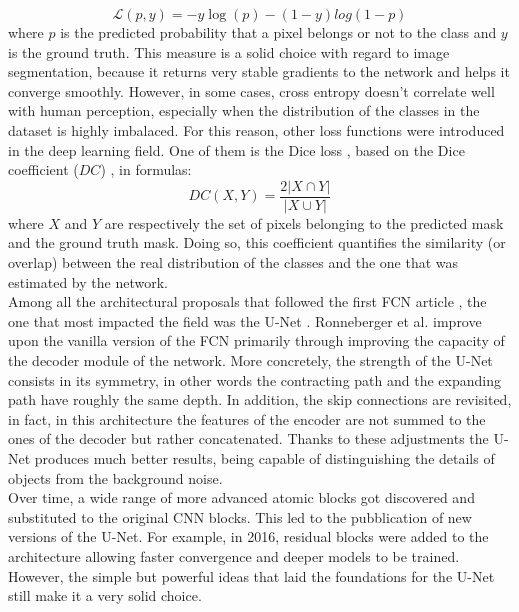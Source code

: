 \begin{equation}
\mathcal{L}(p, y) = -y\log(p)-(1-y)log(1-p)
\end{equation}
where $p$ is the predicted probability that a pixel belongs or not to the class and $y$ is the ground truth. This measure is a solid choice with regard to image segmentation, because it returns very stable gradients to the network and helps it converge smoothly. However, in some cases, cross entropy doesn't correlate well with human perception, especially when the distribution of the classes in the dataset is highly imbalaced. For this reason, other loss functions were introduced in the deep learning field. One of them is the Dice loss \cite{sudre2017generalised}, based on the Dice coefficient ($DC$) \cite{sorensen1948method}\cite{dice1945measures}, in formulas:
\begin{equation}
DC(X,Y) = \frac{2|X\cap Y|}{|X\cup Y|}
\end{equation}
where $X$ and $Y$ are respectively the set of pixels belonging to the predicted mask and the ground truth mask. Doing so, this coefficient quantifies the similarity (or overlap) between the real distribution of the classes and the one that was estimated by the network. \\
Among all the architectural proposals that followed the first FCN article \cite{long2015fully}, the one that most impacted the field was the U-Net \cite{ronneberger2015u}. Ronneberger et al. improve upon the vanilla version of the FCN primarily through improving the capacity of the decoder module of the network. More concretely, the strength of the U-Net consists in its symmetry, in other words the contracting path and the expanding path have roughly the same depth. In addition, the skip connections are revisited, in fact, in this architecture the features of the encoder are not summed to the ones of the decoder but rather concatenated. Thanks to these adjustments the U-Net produces much better results, being capable of distinguishing the details of objects from the background noise.\\
Over time, a wide range of more advanced atomic blocks got discovered and substituted to the original CNN blocks. This led to the pubblication of new versions of the U-Net. For example, in 2016, residual blocks \cite{he2016deep} were added to the architecture \cite{drozdzal2016importance} allowing faster convergence and deeper models to be trained. However, the simple but powerful ideas that laid the foundations for the U-Net still make it a very solid choice.

